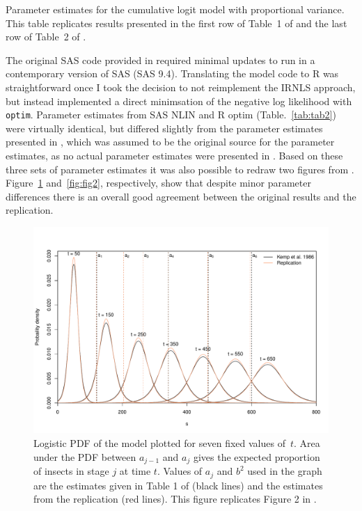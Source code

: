 \begin{table}
  \small
    \centering
    \caption{Parameter estimates for the cumulative logit model with proportional variance. This table replicates results presented in the first row of Table~1 of  \citep{kemp1986stochastic} and the last row of Table~2 of \citep{candy1991modeling}.}
  
  \label{tab:tab2}
\end{table}

The original SAS code provided in \citep{dennis1986stochastic} required minimal updates to run in a contemporary version of SAS (SAS 9.4). 
Translating the model code to R was straightforward once I took the decision to not reimplement the IRNLS approach, but instead implemented a direct minimsation of the negative log likelihood with \verb+optim+.  
Parameter estimates from SAS NLIN and R optim (Table.~\ref{tab:tab2}) were virtually identical, but differed slightly from the parameter estimates presented in \citep{kemp1986stochastic}, which was assumed to be the original source for the parameter estimates, as no actual parameter estimates were presented in \citep{dennis1986stochastic}. 
Based on these three sets of parameter estimates it was also possible to redraw two figures from \citep{dennis1986stochastic}. Figure~\ref{fig:fig1} and~\ref{fig:fig2}, respectively,  show that despite minor parameter differences there is an overall good agreement between the original results and the replication.
 
\begin{figure}
  \centering
  \includegraphics[width=\textwidth]{../figures/dennis_fig2.pdf}
  \caption{Logistic PDF of the \citet{dennis1986stochastic} model plotted for seven fixed values of~$t$. Area under the PDF between $a_{j-1}$ and $a_j$ gives the expected proportion of insects in stage $j$ at time $t$. Values of $a_j$ and $b^2$ used in the graph are the estimates given in Table 1 of \citep{kemp1986stochastic} (black lines) and the estimates from the replication (red lines). This figure replicates Figure 2 in \citep{dennis1986stochastic}.}
  \label{fig:fig1}
\end{figure}


